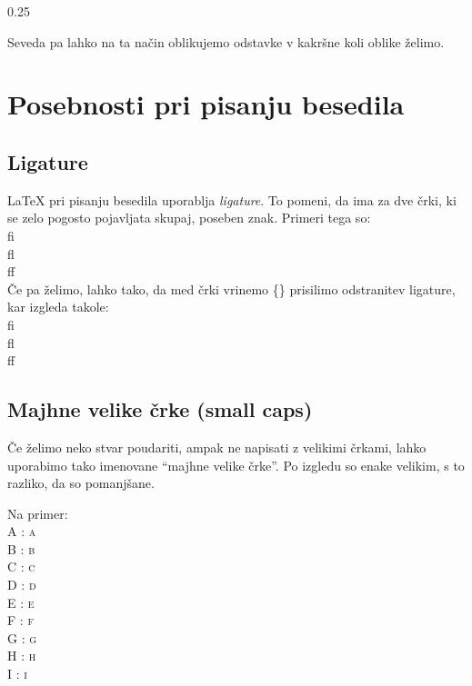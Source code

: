 \documentclass[a4paper]{book}
\newcommand\cmsc[2]{{\huge #1} : {\huge \textsc{#2}}}		%
\begin{document}
0.25\hsize
\noindent\lipsum[1]

Seveda pa lahko na ta način oblikujemo odstavke v kakršne koli oblike želimo.


\section{Posebnosti pri pisanju besedila}

\subsection{Ligature}

\LaTeX{} pri pisanju besedila uporablja \textit{ligature}. To pomeni, da ima za dve črki, ki se zelo pogosto pojavljata skupaj, poseben znak. Primeri tega so:\\[15pt]
{\Huge fi}\\[15pt]
{\Huge fl}\\[15pt]
{\Huge ff}\\[15pt]
Če pa želimo, lahko tako, da med črki vrinemo \{\} prisilimo odstranitev ligature, kar izgleda takole:\\[15pt]
{\Huge f{}i}\\[15pt]
{\Huge f{}l}\\[15pt]
{\Huge f{}f}\\[15pt]

\subsection{Majhne velike črke (small caps)}

Če želimo neko stvar poudariti, ampak ne napisati z velikimi črkami, lahko uporabimo tako imenovane ``majhne velike črke''. Po izgledu so enake velikim, s to razliko, da so pomanjšane.

Na primer:\\
\cmsc{A}{a}\\
\cmsc{B}{b}\\
\cmsc{C}{c}\\
\cmsc{D}{d}\\
\cmsc{E}{e}\\
\cmsc{F}{f}\\
\cmsc{G}{g}\\
\cmsc{H}{h}\\
\cmsc{I}{i}\\
\end{document}
